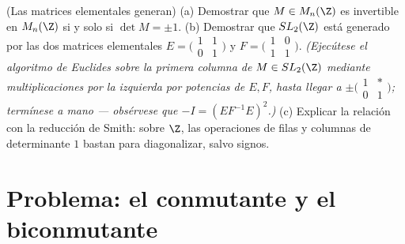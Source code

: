 \begin{exercise}[$\star\star\star$]\label{exo:b3:modules:12}
(Las matrices elementales generan) (a) Demostrar que $M \in M_n(\Z)$ es
invertible en $M_n(\Z)$ si y solo si $\det M = \pm1$. (b) Demostrar que
$SL_2(\Z)$ está generado por las dos matrices elementales
$E = \bigl(\begin{smallmatrix}1 & 1\\ 0 &
1\end{smallmatrix}\bigr)$ y
$F = \bigl(\begin{smallmatrix}1 & 0\\ 1 &
1\end{smallmatrix}\bigr)$.
\emph{(Ejecútese el algoritmo de Euclides sobre la primera columna de $M
\in SL_2(\Z)$ mediante multiplicaciones por la izquierda por potencias
de $E, F$, hasta llegar a $\pm\bigl(\begin{smallmatrix}1 & *\\ 0 &
1\end{smallmatrix}\bigr)$; termínese a mano --- obsérvese que
$-I = (EF^{-1}E)^2$.)}
(c) Explicar la relación con la reducción de Smith: sobre $\Z$, las
operaciones de filas y columnas de determinante $1$ bastan para
diagonalizar, salvo signos.
\end{exercise}

\section{Problema: el conmutante y el biconmutante}

